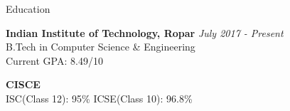 \documentclass{resume2} %
\begin{document}

\begin{rSection}{Education}

{\bf Indian Institute of Technology, Ropar} \hfill {\em July 2017 - Present} \\ 
B.Tech in Computer Science \& Engineering \\
Current GPA: 8.49/10

{\bf CISCE}\\ 
ISC(Class 12): 95\% \hspace{4.6cm} ICSE(Class 10): 96.8\%
\end{rSection}
\end{document}

